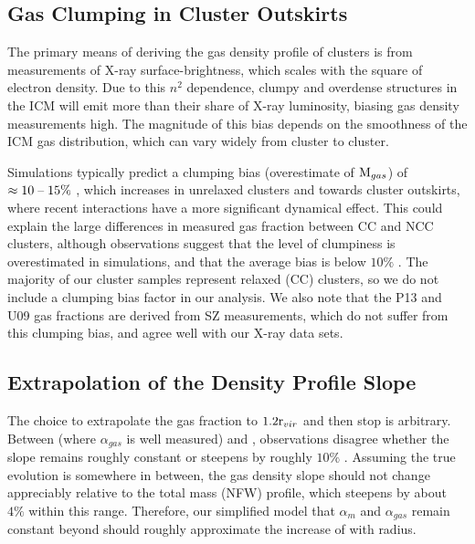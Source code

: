 \subsection{Gas Clumping in Cluster Outskirts}
\label{sec:Limitations.Clumping}

The primary means of deriving the gas density profile of clusters is
from measurements of X-ray surface-brightness, which scales with the
square of electron density. Due to this $n^2$ dependence, clumpy and
overdense structures in the ICM will emit more than their share of
X-ray luminosity, biasing gas density measurements high. The magnitude
of this bias depends on the smoothness of the ICM gas distribution,
which can vary widely from cluster to cluster.

Simulations typically predict a clumping bias (overestimate of
$\textrm{M}{}_{gas}$) of $\approx10\;\textrm{--}\;15\%$ \citep{Nagai2011,Battaglia2013},
which increases in unrelaxed clusters and towards cluster outskirts,
where recent interactions have a more significant dynamical
effect. This could explain the large differences in measured gas
fraction between CC and NCC clusters, although observations suggest
that the level of clumpiness is overestimated in simulations, and that
the average bias is below $10\%$ \citep{Eckert2013c}. The majority of our
cluster samples represent relaxed (CC) clusters, so we do not include
a clumping bias factor in our analysis. We also note that the P13
\citep{PlanckIntV} and U09 \citep{Umetsu2009} gas fractions are
derived from SZ measurements, which do not suffer from this clumping
bias, and agree well with our X-ray data sets. 

\subsection{Extrapolation of the Density Profile Slope}
\label{sec:Limitations.Slope}
The choice to extrapolate the gas fraction to $1.2\textrm{r\ensuremath{_{vir}}}{}$ and then
stop is arbitrary. Between \rfive{} (where $\alpha{}_{gas}$ is well
measured) and \rtwo{}, observations disagree whether the slope remains
roughly constant \citep{Dai2010} or steepens by roughly $10\%$
\citep{Ettori2009a}. Assuming the true evolution is somewhere in
between, the gas density slope should not change appreciably relative
to the total mass (NFW) profile, which steepens by about $4\%$ within
this range. Therefore, our simplified model that $\alpha{}_{m}$ and
$\alpha_{gas}$ remain constant beyond \rtwo{} should roughly
approximate the increase of \fg{} with radius.

